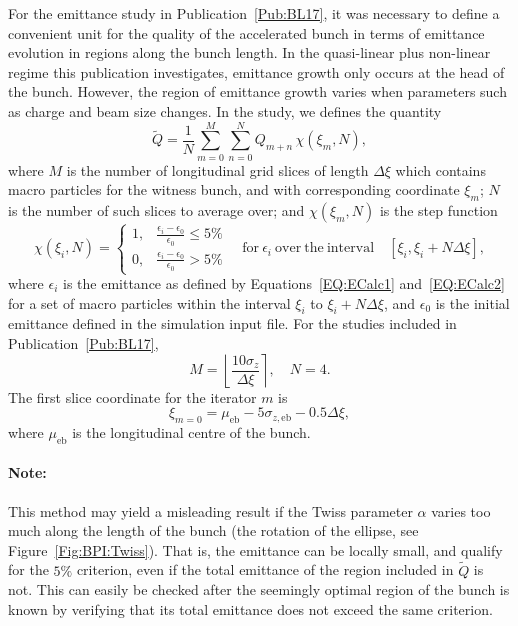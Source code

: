 For the emittance study in Publication~\ref{Pub:BL17}, it was necessary to define a convenient unit for the quality of the accelerated bunch in terms of emittance evolution in regions along the bunch length.
In the quasi-linear plus non-linear regime this publication investigates, emittance growth only occurs at the head of the bunch.
However, the region of emittance growth varies when parameters such as charge and beam size changes.
In the study, we defines the quantity
\begin{equation}
    \tilde{Q} = \frac{1}{N} \sum_{m=0}^{M} \sum_{n=0}^{N} Q_{m+n}\,\chi(\xi_{m},N),
\end{equation}
where $M$ is the number of longitudinal grid slices of length $\Delta\xi$ which contains macro particles for the witness bunch, and with corresponding coordinate $\xi_{m}$; $N$ is the number of such slices to average over; and $\chi(\xi_{m},N)$ is the step function
\begin{equation}
    \chi(\xi_{i},N) =
    \begin{cases}
        1, & \frac{\epsilon_{i} - \epsilon_{0}}{\epsilon_{0}} \leq 5\% \\
        0, & \frac{\epsilon_{i} - \epsilon_{0}}{\epsilon_{0}} > 5\%
    \end{cases}
    \quad\mathrm{for~}\epsilon_{i}\mathrm{~over~the~interval}\quad
    [\xi_{i}, \xi_{i} + N\Delta\xi],
\end{equation}
where $\epsilon_{i}$ is the emittance as defined by Equations~\ref{EQ:ECalc1} and~\ref{EQ:ECalc2} for a set of macro particles within the interval $\xi_{i}$ to $\xi_{i} + N\Delta\xi$, and $\epsilon_{0}$ is the initial emittance defined in the simulation input file.
For the studies included in Publication~\ref{Pub:BL17},
\begin{equation}
    M = \left\lfloor \frac{10\sigma_{z}}{\Delta\xi} \right\rceil, \quad
    N = 4.
\end{equation}
The first slice coordinate for the iterator $m$ is
\begin{equation}
    \xi_{m=0} = \mu_{\mathrm{eb}} - 5\sigma_{z,\mathrm{eb}} - 0.5\Delta\xi,
\end{equation}
where $\mu_{\mathrm{eb}}$ is the longitudinal centre of the bunch.

\paragraph{Note:} This method may yield a misleading result if the Twiss parameter $\alpha$ varies too much along the length of the bunch (the rotation of the ellipse, see Figure~\ref{Fig:BPI:Twiss}).
That is, the emittance can be locally small, and qualify for the $5\%$ criterion, even if the total emittance of the region included in $\tilde{Q}$ is not.
This can easily be checked after the seemingly optimal region of the bunch is known by verifying that its total emittance does not exceed the same criterion.

